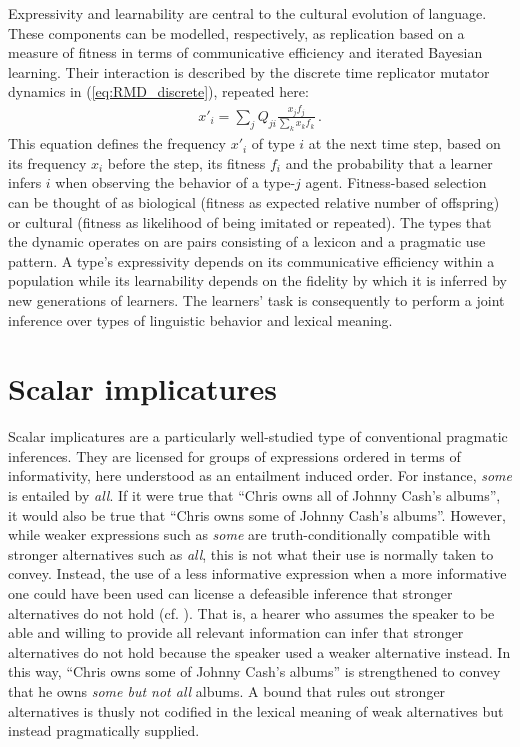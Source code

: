 \documentclass[a4paper]{article}
\begin{document}
Expressivity and learnability are central to the cultural evolution of language. These
components can be modelled, respectively, as replication based on a measure of fitness in terms
of communicative efficiency and iterated Bayesian learning. Their interaction is described by
the discrete time replicator mutator dynamics in (\ref{eq:RMD_discrete}), repeated here:
\begin{align*}
  x'_i = \sum_j Q_{ji} \frac{x_jf_j}{\sum_k x_k f_k}\,.
\end{align*}
This equation defines the frequency $x'_i$ of type $i$ at the next time step, based on its
frequency $x_i$ before the step, its fitness $f_i$ and the probability that a learner infers
$i$ when observing the behavior of a type-$j$ agent. Fitness-based selection can be thought of
as biological (fitness as expected relative number of offspring) or cultural (fitness as 
likelihood of being imitated or repeated). The types that the dynamic operates on are pairs
consisting of a lexicon and a pragmatic use pattern. A type's expressivity depends on its
communicative efficiency within a population while its learnability depends on the fidelity by
which it is inferred by new generations of learners. The learners' task is consequently to
perform a joint inference over types of linguistic behavior and lexical meaning.


\section{Scalar implicatures}\label{sec:si-case-study}
%
Scalar implicatures are a particularly well-studied type of conventional pragmatic inferences. They are licensed for groups of expressions ordered in terms of informativity, here understood as an entailment induced order. For instance, {\em some} is entailed by {\em all}. If it were true that ``Chris owns all of Johnny Cash's albums'', it would also be true that ``Chris owns some of Johnny Cash's albums''. However, while weaker expressions such as {\em some} are truth-conditionally compatible with stronger alternatives such as {\em all}, this is not what their use is normally taken to convey. Instead, the use of a less informative expression when a more informative one could have been used can license a defeasible inference that stronger alternatives do not hold (cf. \citealt{horn:1972,gazdar:1979}). That is, a hearer who assumes the speaker to be able and willing to provide all relevant information can infer that stronger alternatives do not hold because the speaker used a weaker alternative instead. In this way, ``Chris owns some of Johnny Cash's albums'' is strengthened to convey that he owns {\em some but not all} albums. A bound that rules out stronger alternatives is thusly not codified in the lexical meaning of weak alternatives but instead pragmatically supplied.
\end{document}
